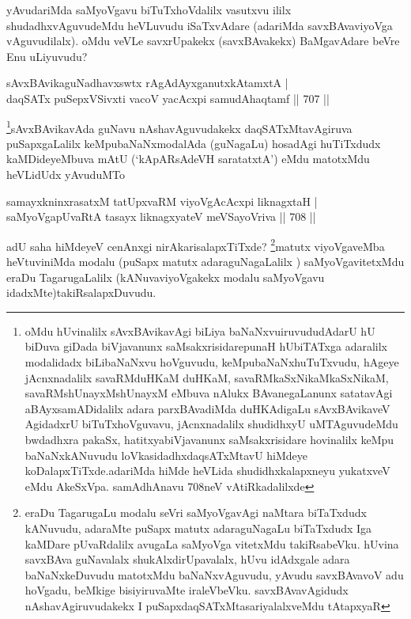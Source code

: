 \begin{artha}
yAvudariMda saMyoVgavu biTuTxhoVdalilx vasutxvu ililx shudadhxvAguvudeMdu heVLuvudu iSaTxvAdare (adariMda savxBAvaviyoVga vAguvudilalx). oMdu veVLe savxrUpakekx (savxBAvakekx) BaMgavAdare beVre Enu uLiyuvudu?
\end{artha}


\begin{shl}
sAvxBAvikaguNadhavxswtx rAgAdAyxganutxkAtamxtA | \\
daqSATx puSepxVSivxti vacoV yacAcxpi samudAhaqtamf \hfill||  707 ||  
\end{shl}

\begin{artha}
\footnote{oMdu hUvinalilx sAvxBAvikavAgi biLiya baNaNxvuiruvududAdarU hU biDuva giDada biVjavanunx saMsakxrisidarepunaH hUbiTATxga adaralilx modalidadx biLibaNaNxvu hoVguvudu, keMpubaNaNxhuTuTxvudu, hAgeye jAcnxnadalilx savaRMduHKaM duHKaM, savaRMkaSxNikaMkaSxNikaM, savaRMshUnayxMshUnayxM eMbuva nAlukx BAvanegaLanunx satatavAgi aBAyxsamADidalilx adara parxBAvadiMda duHKAdigaLu sAvxBAvikaveV AgidadxrU biTuTxhoVguvavu, jAcnxnadalilx shudidhxyU uMTAguvudeMdu bwdadhxra pakaSx, hatitxyabiVjavanunx saMsakxrisidare hovinalilx keMpu baNaNxkANuvudu loVkasidadhxdaqsATxMtavU hiMdeye koDalapxTiTxde.adariMda hiMde heVLida shudidhxkalapxneyu yukatxveV eMdu AkeSxVpa. samAdhAnavu 708neV vAtiRkadalilxde}sAvxBAvikavAda guNavu nAshavAguvudakekx daqSATxMtavAgiruva puSapxgaLalilx keMpubaNaNxmodalAda (guNagaLu) hosadAgi huTiTxdudx kaMDideyeMbuva mAtU (`kApARsAdeVH saratatxtA') eMdu matotxMdu heVLidUdx yAvuduMTo
\end{artha}

\begin{shl}
samayxkninxrasatxM tatUpxvaRM viyoVgAcAcxpi liknagxtaH | \\
saMyoVgapUvaRtA tasayx liknagxyateV meVSayoVriva \hfill||  708 ||  
\end{shl}

\begin{artha}
adU saha hiMdeyeV cenAnxgi nirAkarisalapxTiTxde? \footnote{eraDu TagarugaLu modalu seVri saMyoVgavAgi naMtara biTaTxdudx kANuvudu, adaraMte puSapx matutx adaraguNagaLu biTaTxdudx Iga kaMDare pUvaRdalilx avugaLa saMyoVga vitetxMdu takiRsabeVku. hUvina savxBAva guNavalalx shukAlxdirUpavalalx, hUvu idAdxgale adara baNaNxkeDuvudu matotxMdu baNaNxvAguvudu, yAvudu savxBAvavoV adu hoVgadu, beMkige bisiyiruvaMte iraleVbeVku. savxBAvavAgidudx nAshavAgiruvudakekx I puSapxdaqSATxMtasariyalalxveMdu tAtapxyaR}matutx viyoVgaveMba heVtuviniMda modalu (puSapx matutx adaraguNagaLalilx ) saMyoVgavitetxMdu eraDu TagarugaLalilx (kANuvaviyoVgakekx modalu saMyoVgavu idadxMte)takiRsalapxDuvudu.
\end{artha}

